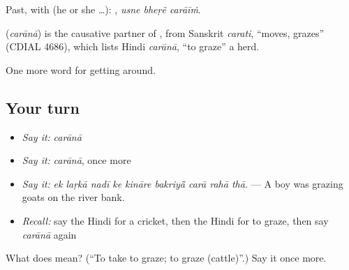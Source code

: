 Past, with  (he or she …):   , \emph{usne bheṛẽ carāīṁ}.

\begin{cousinweb}
\textbf{} (\emph{carānā}) is the causative partner of , from Sanskrit \emph{carati}, \textquotedblleft{}moves, grazes\textquotedblright{} (CDIAL 4686), which lists Hindi \emph{carānā}, \textquotedblleft{}to graze\textquotedblright{} a herd.
\end{cousinweb}

\begin{grammarlens}[title={What you've built}]
One more word for getting around.
\end{grammarlens}

\subsection*{Your turn}
\begin{itemize}
\raggedright
  \item \emph{Say it:} \emph{carānā}
  \item \emph{Say it:} \emph{carānā}, once more
  \item \emph{Say it:} \emph{ek laṛkā nadī ke kināre bakriyā̃ carā rahā thā.} — A boy was grazing goats on the river bank.
  \item \emph{Recall:} say the Hindi for a cricket, then the Hindi for to graze, then say \emph{carānā} again
\end{itemize}

\begin{tcolorbox}[breakable,colback=teal!4,colframe=teal!35!black,title={Before you move on}]
What does  mean? (\textquotedblleft{}To take to graze; to graze (cattle)\textquotedblright{}.) Say it once more.
\end{tcolorbox}
